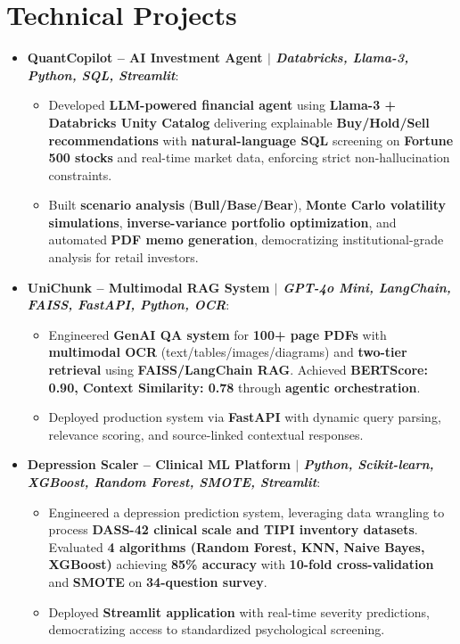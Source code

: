 \documentclass[letterpaper,10pt]{article}
\newcommand{\resumeItem}[2]{
  \item\small{
    \textbf{#1}: #2 \vspace{-2pt}
  }
}
\newcommand{\resumeItemWithoutTitle}[1]{
  \item\small{
    #1 \vspace{-2pt}
  }
}
\newcommand{\resumeSubItem}[2]{\resumeItem{#1}{#2}\vspace{-1pt}}
\newcommand{\resumeSubHeadingListStart}{\begin{itemize}[leftmargin=*]}
\newcommand{\resumeSubHeadingListEnd}{\end{itemize}}
\newcommand{\resumeItemListStart}{\begin{itemize}}
\newcommand{\resumeItemListEnd}{\end{itemize}\vspace{-2pt}}
\begin{document}
\section{Technical Projects}
\vspace{-2pt}
\resumeSubHeadingListStart

\resumeSubItem{QuantCopilot -- AI Investment Agent $|$ \small{\textit{Databricks, Llama-3, Python, SQL, Streamlit}}}{}
\resumeItemListStart
\resumeItemWithoutTitle{Developed \textbf{LLM-powered financial agent} using \textbf{Llama-3 + Databricks Unity Catalog} delivering explainable \textbf{Buy/Hold/Sell recommendations} with \textbf{natural-language SQL} screening on \textbf{Fortune 500 stocks} and real-time market data, enforcing strict non-hallucination constraints.}
\resumeItemWithoutTitle{Built \textbf{scenario analysis} (\textbf{Bull/Base/Bear}), \textbf{Monte Carlo volatility simulations}, \textbf{inverse-variance portfolio optimization}, and automated \textbf{PDF memo generation}, democratizing institutional-grade analysis for retail investors.}
\resumeItemListEnd

\resumeSubItem{UniChunk -- Multimodal RAG System $|$ \small{\textit{GPT-4o Mini, LangChain, FAISS, FastAPI, Python, OCR}}}{}
\resumeItemListStart
\resumeItemWithoutTitle{Engineered \textbf{GenAI QA system} for \textbf{100+ page PDFs} with \textbf{multimodal OCR} (text/tables/images/diagrams) and \textbf{two-tier retrieval} using \textbf{FAISS/LangChain RAG}. Achieved \textbf{BERTScore: 0.90, Context Similarity: 0.78} through \textbf{agentic orchestration}.}
\resumeItemWithoutTitle{Deployed production system via \textbf{FastAPI} with dynamic query parsing, relevance scoring, and source-linked contextual responses.}
\resumeItemListEnd

\resumeSubItem{Depression Scaler -- Clinical ML Platform $|$ \small{\textit{Python, Scikit-learn, XGBoost, Random Forest, SMOTE, Streamlit}}}{}
\resumeItemListStart
\resumeItemWithoutTitle{Engineered a depression prediction system, leveraging data wrangling to process \textbf{DASS-42 clinical scale and TIPI inventory datasets}. Evaluated \textbf{4 algorithms (Random Forest, KNN, Naive Bayes, XGBoost)} achieving \textbf{85\% accuracy} with \textbf{10-fold cross-validation} and \textbf{SMOTE} on \textbf{34-question survey}.}
\resumeItemWithoutTitle{Deployed \textbf{Streamlit application} with real-time severity predictions, democratizing access to standardized psychological screening.}
\resumeItemListEnd
\resumeSubHeadingListEnd

\end{document}
